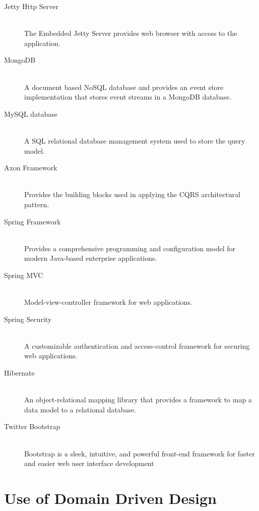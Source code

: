 \begin{description}

  \item[Jetty Http Server] \hfill \\ The Embedded Jetty Server provides web
    browser with access to the application.

  \item[MongoDB ] \hfill \\ A document based NoSQL database and provides an
    event store implementation that stores event streams in a MongoDB database.

  \item[MySQL database ] \hfill \\ A SQL relational database management system
    used to store the query model.

  \item[Axon Framework ] \hfill \\ Provides the building blocks used in
    applying the CQRS architectural pattern.

  \item[Spring Framework ] \hfill \\ Provides a comprehensive programming and
    configuration model for modern Java-based enterprise applications.

  \item[Spring MVC ] \hfill \\ Model-view-controller framework for web
    applications.

  \item[Spring Security ] \hfill \\ A customizable authentication and
    access-control framework for securing web applications.

  \item[Hibernate ] \hfill \\ An object-relational mapping library that
    provides a framework to map a data model to a relational database.

  \item[Twitter Bootstrap ] \hfill \\ Bootstrap is a sleek, intuitive, and
    powerful front-end framework for faster and easier web user interface
    development \cite{bootstrap}

\end{description}

\section{Use of Domain Driven Design}

